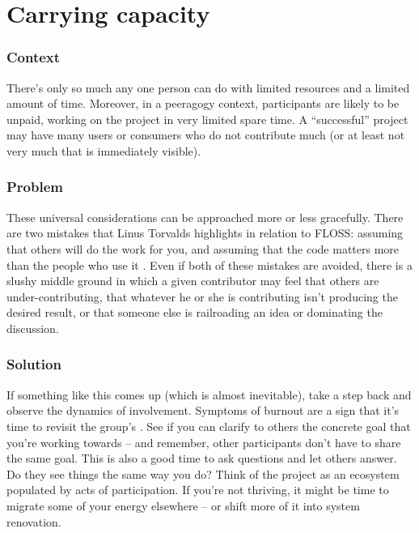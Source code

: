 

\section{Carrying capacity}\label{sec:Carrying_capacity}
\subsubsection*{Context} There's only so much any one person can do with
limited resources and a limited amount of time.  Moreover, in a
peeragogy context, participants are likely to be unpaid, working on
the project in very limited spare time. A ``successful'' project may have many
users or consumers who do not contribute much (or at least not very much that is immediately visible).

\subsubsection*{Problem} These universal considerations can
be approached more or less gracefully.  There are two mistakes that
Linus Torvalds highlights in relation to FLOSS: assuming that others
will do the work for you, and assuming that the code matters more than
the people who use it \cite{torvalds-interview}.  Even if both of these mistakes are avoided,
there is a slushy middle ground in which a given contributor may feel
that others are under-contributing, that whatever he or she is
contributing isn't producing the desired result, or that someone else
is railroading an idea or dominating the discussion.

\subsubsection*{Solution} If something like this comes up (which is almost inevitable),
take a step back and observe the dynamics of involvement.  Symptoms of
burnout are a sign that it's time to revisit the group's
.  See if you can clarify to others the concrete
goal that you're working towards -- and remember, other participants
don't have to share the same goal.  This is also a good time to ask
questions and let others answer.  Do they see things the same way you do?
Think of the project as an ecosystem populated by acts of participation.
If you're not thriving, it might be time to migrate some of your energy
elsewhere -- or shift more of it into system renovation.

